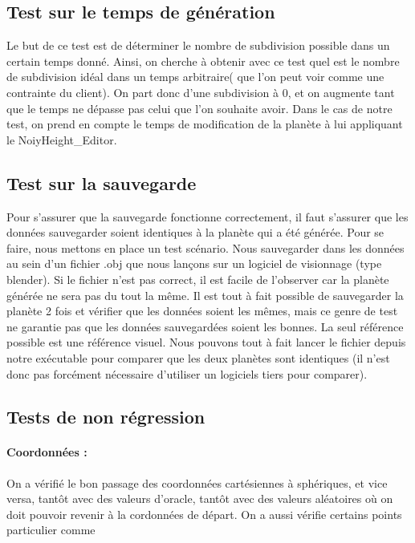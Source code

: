 \documentclass[a4paper]{article}
\begin{document}
\subsection{Test sur le temps de génération}

Le but de ce test est de déterminer le nombre de subdivision possible dans un certain temps donné. Ainsi, on cherche à obtenir avec ce test quel est le nombre de subdivision idéal dans un temps arbitraire( que l'on peut voir comme une contrainte du client). On part donc d'une subdivision à 0, et on augmente tant que le temps ne dépasse pas celui que l'on souhaite avoir. Dans le cas de notre test, on prend en compte le temps de modification de la planète à lui appliquant le NoiyHeight\_Editor.

\subsection{Test sur la sauvegarde}

Pour s'assurer que la sauvegarde fonctionne correctement, il faut s'assurer que les données sauvegarder soient identiques à la planète qui a été générée. Pour se faire, nous mettons en place un test scénario. Nous sauvegarder dans les données au sein d'un fichier .obj que nous lançons sur un logiciel de visionnage (type blender). Si le fichier n'est pas correct, il est facile de l'observer car la planète générée ne sera pas du tout la même. Il est tout à fait possible de sauvegarder la planète 2 fois et vérifier que les données soient les mêmes, mais ce genre de test ne garantie pas que les données sauvegardées soient les bonnes. La seul référence possible est une référence visuel. Nous pouvons tout à fait lancer le fichier depuis notre exécutable pour comparer que les deux planètes sont identiques (il n'est donc pas forcément nécessaire d'utiliser un logiciels tiers pour comparer).

\subsection{Tests de non régression}

\paragraph{Coordonnées : } On a vérifié le bon passage des coordonnées cartésiennes à sphériques, et vice versa, tantôt avec des valeurs d'oracle, tantôt avec des valeurs aléatoires où on doit pouvoir revenir à la cordonnées de départ.
On a aussi vérifie certains points particulier comme 
\end{document}
